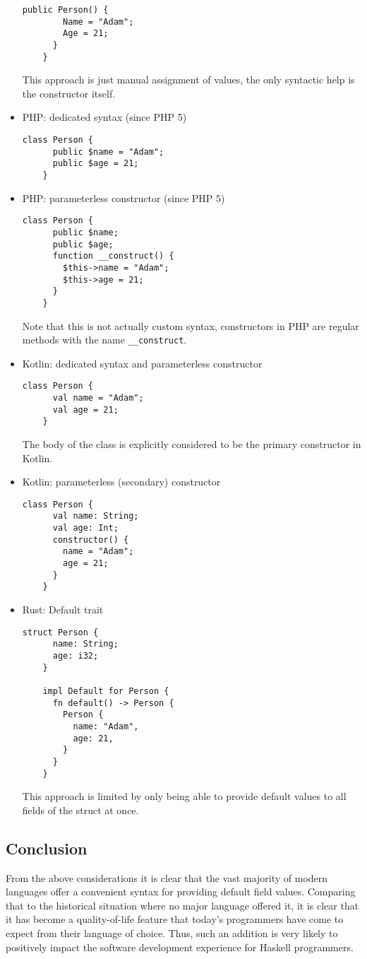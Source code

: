 \documentclass[en]{pracamgr}
\begin{document}
\begin{itemize}
\begin{lstlisting}[style=CSharp]
      public Person() {
        Name = "Adam";
        Age = 21;
      }
    }
  \end{lstlisting}
  This approach is just manual assignment of values, the only syntactic help is the constructor itself.
  \item PHP: dedicated syntax (since PHP 5)
  \begin{lstlisting}[style=PHP]
    class Person {
      public $name = "Adam";
      public $age = 21;
    }
  \end{lstlisting}
  \item  PHP: parameterless constructor (since PHP 5)
  \begin{lstlisting}[style=PHP]
    class Person {
      public $name;
      public $age;
      function __construct() {
        $this->name = "Adam";
        $this->age = 21;
      }
    }
  \end{lstlisting}
  Note that this is not actually custom syntax, constructors in PHP are regular methods
  with the name \texttt{\_\_construct}.
  \item Kotlin: dedicated syntax and parameterless constructor
  \begin{lstlisting}[style=Kotlin]
    class Person {
      val name = "Adam";
      val age = 21;
    }
  \end{lstlisting}
  The body of the class is explicitly considered to be the primary constructor in Kotlin.
  \item Kotlin: parameterless (secondary) constructor
  \begin{lstlisting}[style=Kotlin]
    class Person {
      val name: String;
      val age: Int;
      constructor() {
        name = "Adam";
        age = 21;
      }
    }
  \end{lstlisting}
  \item Rust: Default trait
  \begin{lstlisting}[style=Rust]
    struct Person {
      name: String;
      age: i32;
    }

    impl Default for Person {
      fn default() -> Person {
        Person {
          name: "Adam",
          age: 21,
        }
      }
    }
  \end{lstlisting}
  This approach is limited by only being able to provide default values to all fields 
  of the struct at once.
\end{itemize}

\subsection{Conclusion}
From the above considerations it is clear that the vast majority of modern languages 
offer a convenient syntax for providing default field values. 
Comparing that to the historical situation where no major language offered it,
it is clear that it has become a quality-of-life feature 
that today's programmers have come to expect from their language of choice.
Thus, such an addition is very likely to positively impact the software development
experience for Haskell programmers.
\end{document}
